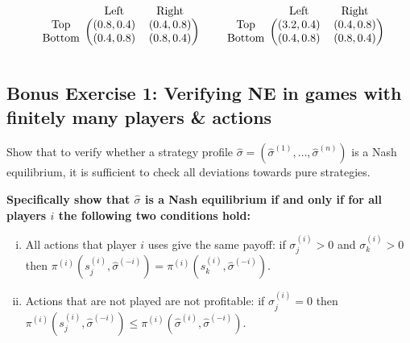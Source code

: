 \documentclass[10pt]{article}
\begin{document}
\begin{equation*}
    \begin{blockarray}{ccc}
        & \text{Left} & \text{Right} \\
        \begin{block}{c(cc)}
            \text{Top} &    (0.8, 0.4) & (0.4, 0.8) \\
            \text{Bottom} & (0.4, 0.8) & (0.8, 0.4) \\
        \end{block}
    \end{blockarray}\qquad
    \begin{blockarray}{ccc}
        & \text{Left} & \text{Right} \\
        \begin{block}{c(cc)}
            \text{Top} &    (3.2, 0.4) & (0.4, 0.8) \\
            \text{Bottom} & (0.4, 0.8) & (0.8, 0.4) \\
        \end{block}
    \end{blockarray}
    \end{equation*}

\subsection*{Bonus Exercise 1: Verifying NE in games with finitely many players \& actions}

Show that to verify whether a strategy profile \(\hat{\sigma} =
(\hat{\sigma}^{(1)}, \dots, \hat{\sigma}^{(n)})\) is a Nash equilibrium, it is
sufficient to check all deviations towards pure strategies.

\textbf{Specifically show that \(\hat{\sigma}\) is a Nash equilibrium if and only if for
all players \(i\) the following two conditions hold:}

\begin{enumerate}[(i)]
    \item All actions that player \(i\) uses give the same payoff: if
    \(\sigma^{(i)}_j > 0\) and \(\sigma^{(i)}_k > 0\) then
    \(\pi^{(i)}(s^{(i)}_j, \hat{\sigma}^{(-i)}) = \pi^{(i)}(s^{(i)}_k,
    \hat{\sigma}^{(-i)})\).
    \item Actions that are not played are not profitable: if \(\sigma^{(i)}_j =
    0\) then \(\pi^{(i)}(s^{(i)}_j, \hat{\sigma}^{(-i)}) \leq
    \pi^{(i)}(\hat{\sigma}^{(i)}, \hat{\sigma}^{(-i)})\).
\end{enumerate}
\end{document}
